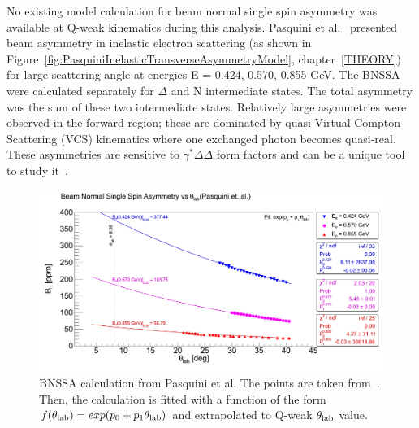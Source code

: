 No existing model calculation for beam normal single spin asymmetry was available at Q-weak kinematics during this analysis. Pasquini et al.~\cite{presentation:pasquini_Mainz} presented beam asymmetry in inelastic electron scattering (as shown in Figure~\ref{fig:PasquiniInelasticTransverseAsymmetryModel}, chapter~\ref{THEORY}) for large scattering angle at energies E = 0.424, 0.570, 0.855 GeV. The BNSSA were calculated separately for $\Delta$ and N intermediate states. The total asymmetry was the sum of these two intermediate states. 
Relatively large asymmetries were observed in the forward region; these are dominated by quasi Virtual Compton Scattering (VCS) kinematics where one exchanged photon becomes quasi-real.
These asymmetries are  sensitive to $\gamma^{\ast}\Delta\Delta$ form factors and can be a unique tool to study it~\cite{Alexandrou2009115}. 

%

\begin{figure}[!h]
	\begin{center}
	\includegraphics[width=15.0cm]{figures/theoryAsymmetryPasquini}
	\end{center}
	\caption
	{BNSSA calculation from Pasquini et al. The points are taken from~\cite{presentation:pasquini_Mainz}. Then, the calculation is fitted with a function of the form $f(\theta_{\rm lab}) = exp(p_{0}+p_{1}\theta_{\rm lab})$ and extrapolated to Q-weak $\theta_{\rm lab}$ value. }
	\label{fig:theoryAsymmetryPasquini}
\end{figure}

